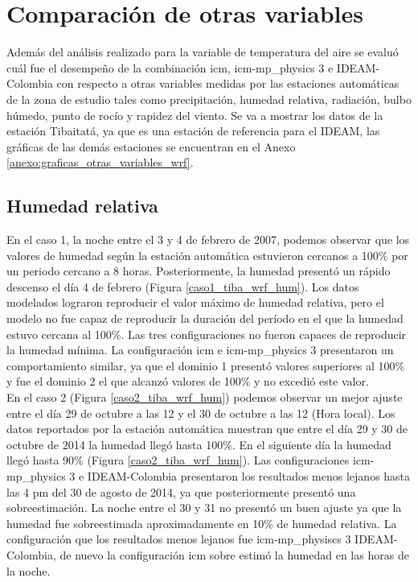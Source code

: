 \section{Comparación de otras variables}

Además del análisis realizado para la variable de temperatura del aire se evaluó cuál fue el desempeño de la combinación icm, icm-mp\_physics 3 e IDEAM-Colombia con respecto a otras variables medidas por las estaciones automáticas de la zona de estudio tales como precipitación, humedad relativa, radiación, bulbo húmedo, punto de rocío y rapidez del viento. Se va a mostrar los datos de la estación Tibaitatá, ya que es una estación de referencia para el IDEAM, las gráficas de las demás estaciones se encuentran en el Anexo \ref{anexo:graficas_otras_variables_wrf}.\\

\subsection{Humedad relativa}


En el caso 1, la noche entre el 3 y 4 de febrero de 2007, podemos observar que los valores de humedad según la estación automática estuvieron cercanos a 100\% por un periodo cercano a 8 horas. Posteriormente, la humedad presentó un rápido descenso el día 4 de febrero (Figura \ref{caso1_tiba_wrf_hum}). Los datos modelados lograron reproducir el valor máximo de humedad relativa, pero el modelo no fue capaz de reproducir la duración del período en el que la humedad estuvo cercana al 100\%. Las tres configuraciones no fueron capaces de reproducir la humedad mínima. La configuración icm e icm-mp\_physics 3 presentaron un comportamiento similar, ya que el dominio 1 presentó valores superiores al 100\% y fue el dominio 2 el que alcanzó valores de 100\% y no excedió este valor.\\

En el caso 2 (Figura \ref{caso2_tiba_wrf_hum}) podemos observar un mejor ajuste entre el día 29 de octubre a las 12 y el 30 de octubre a las 12 (Hora local). Los datos reportados por la estación automática muestran que entre el día 29 y 30 de octubre de 2014 la humedad llegó hasta 100\%. En el siguiente día la humedad llegó hasta 90\% (Figura \ref{caso2_tiba_wrf_hum}). Las configuraciones icm-mp\_physics 3 e IDEAM-Colombia presentaron los resultados menos lejanos hasta las 4 pm del 30 de agosto de 2014, ya que posteriormente presentó una sobreestimación. La noche entre el 30 y 31 no presentó un buen ajuste ya que la humedad fue sobreestimada aproximadamente en 10\% de humedad relativa. La configuración que los resultados menos lejanos fue icm-mp\_physiscs 3 IDEAM-Colombia, de nuevo la configuración icm sobre estimó la humedad en las horas de la noche.\\

